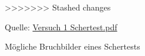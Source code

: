 \begin{figure}
>>>>>>> Stashed changes
    \caption{Mögliche Bruchbilder eines Schertests}
    \par Quelle: \href{https://learn.fh-kiel.de/mod/folder/view.php?id=160797}{Versuch 1 Schertest.pdf}
    \vspace{0.2cm}
    \label{Abb.3: Mögliche Bruchbilder eines Schertests}
\end{figure}
\\
